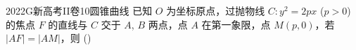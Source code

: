 
\begin{problem}{2022}{G}{新高考II卷}{10}{圆锥曲线}
已知 $ O $ 为坐标原点，过抛物线 $ C: y^2 = 2px $ ($ p > 0 $) 的焦点 $ F $ 的直线与 $ C $ 交于 $ A $, $ B $ 两点，点 $ A $ 在第一象限，点 $ M(p, 0) $，若 $ |AF| = |AM| $，则 (\hspace{1cm})
\begin{choices}
\end{choices}
\end{problem}

\begin{answer}

\end{answer}

\begin{solutions}

\end{solutions}